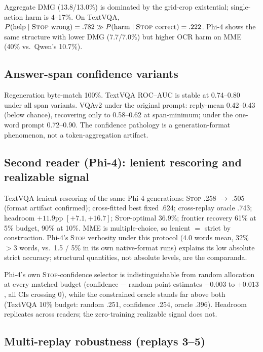 \documentclass[10pt]{article}
\begin{document}
Aggregate DMG (13.8/13.0\%) is dominated by the grid-crop existential;
single-action harm is 4--17\%. On TextVQA,
$P(\text{help}\mid\text{\textsc{Stop} wrong}) = .782 \gg
P(\text{harm}\mid\text{\textsc{Stop} correct}) = .222$.
Phi-4 shows the same structure with lower DMG (7.7/7.0\%) but higher
\textsc{OCR} harm on MME (40\% vs.\ Qwen's 10.7\%).

\subsection{Answer-span confidence variants}
\label{sec:results:spanconf}

Regeneration byte-match 100\%. TextVQA ROC--AUC is stable at 0.74--0.80
under all span variants. VQAv2 under the original prompt: reply-mean
0.42--0.43 (below chance), recovering only to 0.58--0.62 at span-minimum;
under the one-word prompt 0.72--0.90. The confidence pathology is a
generation-format phenomenon, not a token-aggregation artifact.

\subsection{Second reader (Phi-4): lenient rescoring and realizable signal}

TextVQA lenient rescoring of the same Phi-4 generations: \textsc{Stop}
.258 $\to$ .505 (format artifact confirmed); cross-fitted best fixed .624;
cross-replay oracle .743; headroom $+11.9$pp $[+7.1, +16.7]$;
\textsc{Stop}-optimal 36.9\%; frontier recovery 61\% at 5\% budget, 90\% at
10\%. MME is multiple-choice, so lenient $=$ strict by construction.
Phi-4's \textsc{Stop} verbosity under this protocol (4.0 words mean, 32\%
$>$3 words, vs.\ 1.5 / 5\% in its own native-format runs) explains its low
absolute strict accuracy; structural quantities, not absolute levels, are
the comparanda.

Phi-4's own \textsc{Stop}-confidence selector is indistinguishable from
random allocation at every matched budget (confidence $-$ random point
estimates $-0.003$ to $+0.013$, all CIs crossing 0), while the constrained
oracle stands far above both (TextVQA 10\% budget: random .251, confidence
.254, oracle .396). Headroom replicates across readers; the zero-training
realizable signal does not.

\subsection{Multi-replay robustness (replays 3--5)}
\label{sec:results:multireplay}
\end{document}
